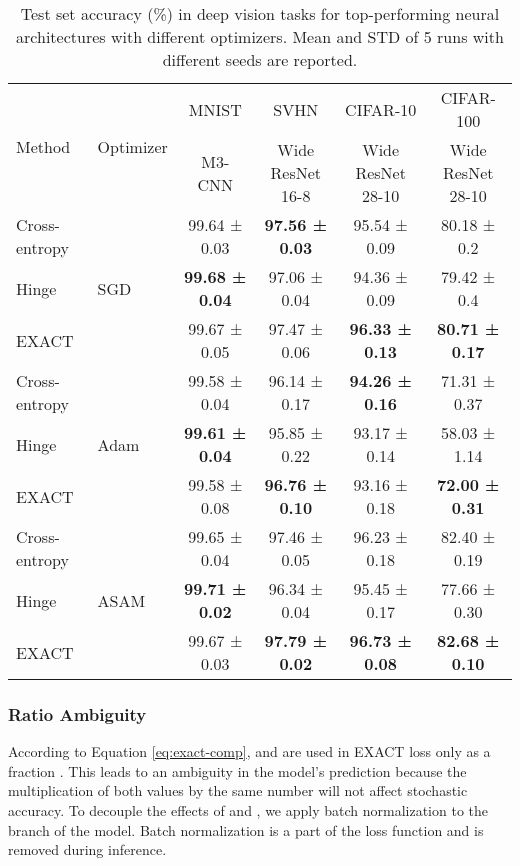 \documentclass[nohyperref]{article}
\theoremstyle{plain}
\theoremstyle{definition}
\theoremstyle{remark}
\begin{document}
\begin{table*}[t]
\centering
\vskip 0.2in
\begin{tabular}{l|l|cccc}
\multirow{2}{*}{Method} & \multirow{2}{*}{Optimizer} & MNIST & SVHN & CIFAR-10 & CIFAR-100 \\
& & \scriptsize M3-CNN & \scriptsize Wide ResNet 16-8 & \scriptsize Wide ResNet 28-10 & \scriptsize Wide ResNet 28-10 \\
\hline
Cross-entropy & \multirow{3}{*}{SGD} & 99.64 ± 0.03 & \bf 97.56 ± 0.03 & 95.54 ± 0.09 & 80.18 ± 0.2 \\
Hinge & & \bf 99.68 ± 0.04 & 97.06 ± 0.04 & 94.36 ± 0.09 & 79.42 ± 0.4 \\
EXACT & & 99.67 ± 0.05 & 97.47 ± 0.06 & \bf 96.33 ± 0.13 & \bf 80.71 ± 0.17 \\
\hline
Cross-entropy & \multirow{3}{*}{Adam}
        & 99.58 ± 0.04 & 96.14 ± 0.17 & \bf 94.26 ± 0.16 & 71.31 ± 0.37 \\
Hinge & & \bf 99.61 ± 0.04 & 95.85 ± 0.22 & 93.17 ± 0.14 & 58.03 ± 1.14 \\
EXACT & & 99.58 ± 0.08 & \bf 96.76 ± 0.10 & 93.16 ± 0.18 & \bf 72.00 ± 0.31 \\
\hline
Cross-entropy & \multirow{3}{*}{ASAM} & 99.65 ± 0.04 & 97.46 ± 0.05 & 96.23 ± 0.18 & 82.40 ± 0.19 \\
Hinge & & \bf 99.71 ± 0.02 & 96.34 ± 0.04 & 95.45 ± 0.17 & 77.66 ± 0.30\\
EXACT & & 99.67 ± 0.03 & \bf 97.79 ± 0.02 & \bf 96.73 ± 0.08 & \bf 82.68 ± 0.10 \\
\end{tabular}
\vskip 0.2in
\caption{Test set accuracy (\%) in deep vision tasks for top-performing neural architectures with different optimizers. Mean and STD of 5 runs with different seeds are reported.}
\label{tab:vision}
\end{table*}

\subsubsection{Ratio Ambiguity}
According to Equation \ref{eq:exact-comp},  and  are used in EXACT loss only as a fraction . This leads to an ambiguity in the model's prediction because the multiplication of both values by the same number will not affect stochastic accuracy. To decouple the effects of  and , we apply batch normalization \cite{ioffe2015batch} to the  branch of the model. Batch normalization is a part of the loss function and is removed during inference.
\end{document}
